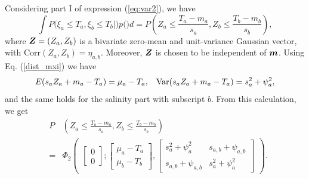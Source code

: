\documentclass[aoas]{imsart}
\begin{document}
Considering part I of expression (\ref{eq:var2}), we have
\begin{equation}\label{part1:phi2}
 \int P(\xi_a \leq T_a, \xi_b \leq T_b|\bm) p(\bm) d\bm= 
P \left( Z_{a} \leq \frac{T_a-m_{a}}{s_{a}}, 
Z_{b} \leq \frac{T_b-m_{b}}{s_{b}} \right), \nonumber
\end{equation}
where ${\boldsymbol Z}=(Z_{a},Z_{b})$ is a bivariate zero-mean and unit-variance Gaussian vector, with $\mbox{Corr}(Z_{a},Z_{b})=\eta_{a,b}$. Moreover, ${\boldsymbol Z}$ is chosen to be independent of ${\boldsymbol m}$. Using Eq. (\ref{dist_mxi}) we have
\begin{equation}
    E(s_{a} Z_{a}+m_{a}-T_a) = \mu_{a}-T_a, \hspace{3mm}
    \mbox{Var}(s_{a} Z_{a}+m_{a}-T_a) = s^2_a+ \psi^2_{a}, 
\end{equation}
and the same holds for the salinity part with subscript $b$. From this calculation, we get
\begin{eqnarray}\label{two_parts0}
& P & \left( Z_{a} \leq \frac{T_a-m_{a}}{s_{a}}, 
Z_{b} \leq \frac{T_b-m_{b}}{s_{b}} \right) \\
&=& \Phi_2 \begin{pmatrix} 
\begin{bmatrix} 0\\
0
\end{bmatrix};
\begin{bmatrix} \mu_{a}-T_a\\
\mu_{b}-T_b
\end{bmatrix},\begin{bmatrix}
s^2_a+ \psi^2_{a} & s_{a,b}+\psi_{a,b}  \\
s_{a,b}+\psi_{a,b}   & s^2_a+ \psi^2_{a} 
\end{bmatrix}\end{pmatrix} \nonumber.
\end{eqnarray}
\end{document}

